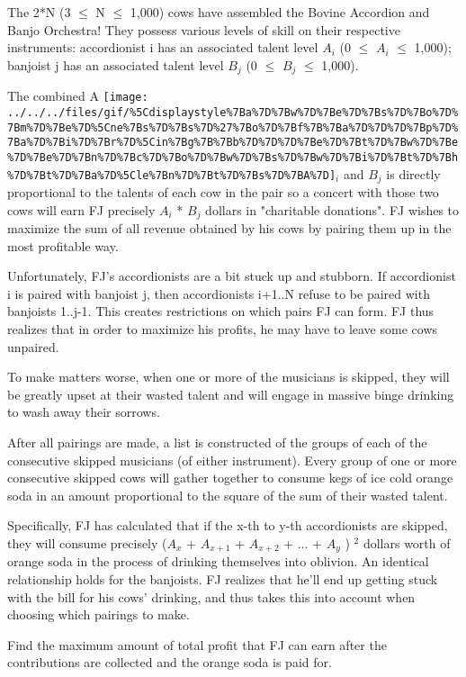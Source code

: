The 2*N (3  $\le$  N  $\le$  1,000) cows have assembled the Bovine Accordion and Banjo Orchestra!  They possess various levels of skill on their respective instruments: accordionist i has an associated talent level $A_{i}$   (0  $\le$  $A_{i}$    $\le$  1,000); banjoist j has an associated talent level $B_{j}$   (0  $\le$  $B_{j}$    $\le$  1,000).  

   The combined A   
\texttt{[image: ../../../files/gif/\%5Cdisplaystyle\%7Ba\%7D\%7Bw\%7D\%7Be\%7D\%7Bs\%7D\%7Bo\%7D\%7Bm\%7D\%7Be\%7D\%5Cne\%7Bs\%7D\%7Bs\%7D\%27\%7Bo\%7D\%7Bf\%7B\%7Ba\%7D\%7D\%7D\%7Bp\%7D\%7Ba\%7D\%7Bi\%7D\%7Br\%7D\%5Cin\%7Bg\%7B\%7Bb\%7D\%7D\%7D\%7Be\%7D\%7Bt\%7D\%7Bw\%7D\%7Be\%7D\%7Be\%7D\%7Bn\%7D\%7Bc\%7D\%7Bo\%7D\%7Bw\%7D\%7Bs\%7D\%7Bw\%7D\%7Bi\%7D\%7Bt\%7D\%7Bh\%7D\%7Bt\%7D\%7Ba\%7D\%5Cle\%7Bn\%7D\%7Bt\%7D\%7Bs\%7D\%7BA\%7D]}$_    i   $   and $B_{j}$   is directly proportional to the talents of each cow in the pair so a concert with those two cows will earn FJ precisely $A_{i}$   * $B_{j}$   dollars in "charitable donations".  FJ wishes to maximize the sum of all revenue obtained by his cows by pairing them up in the most profitable way.  

   Unfortunately, FJ's accordionists are a bit stuck up and stubborn. If accordionist i is paired with banjoist j, then accordionists i+1..N refuse to be paired with banjoists 1..j-1. This creates restrictions on which pairs FJ can form. FJ thus realizes that in order to maximize his profits, he may have to leave some cows unpaired.  

   To make matters worse, when one or more of the musicians is skipped, they will be greatly upset at their wasted talent and will engage in massive binge drinking to wash away their sorrows.  

   After all pairings are made, a list is constructed of the groups of each of the consecutive skipped musicians (of either instrument). Every group of one or more consecutive skipped cows will gather together to consume kegs of ice cold orange soda in an amount proportional to the square of the sum of their wasted talent.  

   Specifically, FJ has calculated that if the x-th to y-th accordionists are skipped, they will consume precisely ($A_{x}$   + $A_{x+1}$   + $A_{x+2}$   + ... + $A_{y}$   )   $^    2   $   dollars worth of orange soda in the process of drinking themselves into oblivion. An identical relationship holds for the banjoists. FJ realizes that he'll end up getting stuck with the bill for his cows' drinking, and thus takes this into account when choosing which pairings to make.  

   Find the maximum amount of total profit that FJ can earn after the contributions are collected and the orange soda is paid for.